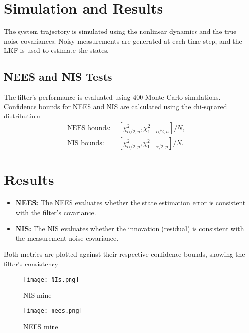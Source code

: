\documentclass{article}
\begin{document}
\section*{Simulation and Results}

The system trajectory is simulated using the nonlinear dynamics and the true noise covariances. Noisy measurements are generated at each time step, and the LKF is used to estimate the states.

\subsection*{NEES and NIS Tests}

The filter's performance is evaluated using 400 Monte Carlo simulations. Confidence bounds for NEES and NIS are calculated using the chi-squared distribution:
\begin{align}
\text{NEES bounds: } &\left[\chi^2_{\alpha/2, n}, \chi^2_{1-\alpha/2, n}\right] / N, \\
\text{NIS bounds: } &\left[\chi^2_{\alpha/2, p}, \chi^2_{1-\alpha/2, p}\right] / N.
\end{align}

\section*{Results}

\begin{itemize}
    \item \textbf{NEES:} The NEES evaluates whether the state estimation error is consistent with the filter's covariance.
    \item \textbf{NIS:} The NIS evaluates whether the innovation (residual) is consistent with the measurement noise covariance.
\end{itemize}

Both metrics are plotted against their respective confidence bounds, showing the filter's consistency.
\begin{figure}
    \centering
    \texttt{[image: NIs.png]}
    \caption{NIS mine}
    \label{fig:enter-label}
\end{figure}
\begin{figure}
    \centering
    \texttt{[image: nees.png]}
    \caption{NEES mine}
    \label{fig:enter-label}
\end{figure}
\end{document}

